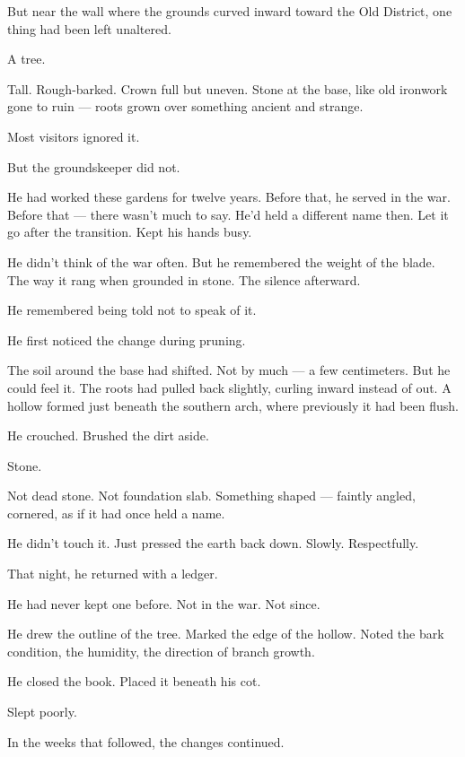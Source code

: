 \documentclass[12pt]{article}
\begin{document}
But near the wall where the grounds curved inward toward the Old District, one thing had been left unaltered.

A tree.

Tall. Rough-barked. Crown full but uneven. Stone at the base, like old ironwork gone to ruin --- roots grown over something ancient and strange.

Most visitors ignored it.

But the groundskeeper did not.

He had worked these gardens for twelve years. Before that, he served in the war. Before that --- there wasn’t much to say. He’d held a different name then. Let it go after the transition. Kept his hands busy.

He didn’t think of the war often. But he remembered the weight of the blade. The way it rang when grounded in stone. The silence afterward.

He remembered being told not to speak of it.

\vspace{1em}

He first noticed the change during pruning.

The soil around the base had shifted. Not by much --- a few centimeters. But he could feel it. The roots had pulled back slightly, curling inward instead of out. A hollow formed just beneath the southern arch, where previously it had been flush.

He crouched. Brushed the dirt aside.

Stone.

Not dead stone. Not foundation slab. Something shaped --- faintly angled, cornered, as if it had once held a name.

He didn’t touch it. Just pressed the earth back down. Slowly. Respectfully.

\vspace{1em}

That night, he returned with a ledger.

He had never kept one before. Not in the war. Not since.

He drew the outline of the tree. Marked the edge of the hollow. Noted the bark condition, the humidity, the direction of branch growth.

He closed the book. Placed it beneath his cot.

Slept poorly.

\vspace{1em}

In the weeks that followed, the changes continued.
\end{document}
